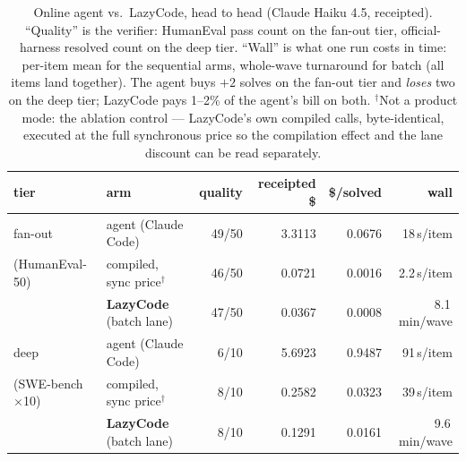 \documentclass[11pt]{article}
\begin{document}
\begin{table}[!htbp]
\centering
\caption{Online agent vs.\ LazyCode, head to head (Claude Haiku 4.5,
receipted). ``Quality'' is the verifier: HumanEval pass count on the
fan-out tier, official-harness resolved count on the deep tier.
``Wall'' is what one run costs in time: per-item mean for the
sequential arms, whole-wave turnaround for batch (all items land
together). The agent buys $+2$ solves on the fan-out tier and
\emph{loses} two on the deep tier; LazyCode pays 1--2\% of the
agent's bill on both. $^{\dagger}$Not a product mode: the ablation
control --- LazyCode's own compiled calls, byte-identical, executed at
the full synchronous price so the compilation effect and the lane
discount can be read separately.}
\label{tab:headtohead}
\small
\begin{tabular}{llrrrr}
\toprule
tier & arm & quality & receipted \$ & \$/solved & wall \\
\midrule
fan-out & agent (Claude Code) & 49/50 & 3.3113 & 0.0676 & 18\,s/item \\
(HumanEval-50) & compiled, sync price$^{\dagger}$ & 46/50 & 0.0721 & 0.0016 & 2.2\,s/item \\
 & \textbf{LazyCode} (batch lane) & 47/50 & 0.0367 & 0.0008 & 8.1\,min/wave \\
\addlinespace
deep & agent (Claude Code) & 6/10 & 5.6923 & 0.9487 & 91\,s/item \\
(SWE-bench $\times$10) & compiled, sync price$^{\dagger}$ & 8/10 & 0.2582 & 0.0323 & 39\,s/item \\
 & \textbf{LazyCode} (batch lane) & 8/10 & 0.1291 & 0.0161 & 9.6\,min/wave \\
\bottomrule
\end{tabular}
\end{table}
\end{document}

